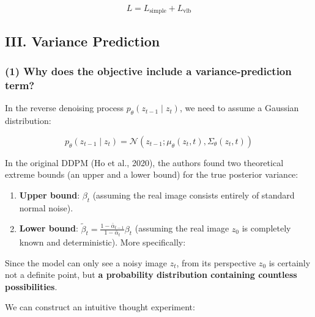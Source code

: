 \[
L=L_{\mathrm{simple}}+L_{\mathrm{vlb}}
\]

\hypertarget{iii.-variance-prediction}{%
\subsection{III. Variance Prediction}\label{iii.-variance-prediction}}

\hypertarget{why-does-the-objective-include-a-variance-prediction-term}{%
\subsubsection{(1) Why does the objective include a variance-prediction term?}\label{why-does-the-objective-include-a-variance-prediction-term}}

In the reverse denoising process \(p_\theta(z_{t-1}\mid z_t)\), we need to assume a Gaussian distribution:

\[
p_\theta(z_{t-1}\mid z_t)=\mathcal{N}(z_{t-1};\mu_\theta(z_t,t),\Sigma_\theta(z_t,t))
\]

In the original DDPM (Ho et al., 2020), the authors found two theoretical extreme bounds (an upper and a lower bound) for the true posterior variance:

\begin{enumerate}
\def\labelenumi{\arabic{enumi}.}
\tightlist
\item
  \textbf{Upper bound}: \(\beta_t\) (assuming the real image consists entirely of standard normal noise).
\item
  \textbf{Lower bound}: \(\tilde{\beta}_t=\frac{1-\bar{\alpha}_{t-1}}{1-\bar{\alpha}_t}\beta_t\) (assuming the real image \(z_0\) is completely known and deterministic).
  More specifically:
\end{enumerate}

Since the model can only see a noisy image \(z_t\), from its perspective \(z_0\) is certainly not a definite point, but \textbf{a probability distribution containing countless possibilities}.

We can construct an intuitive thought experiment:

